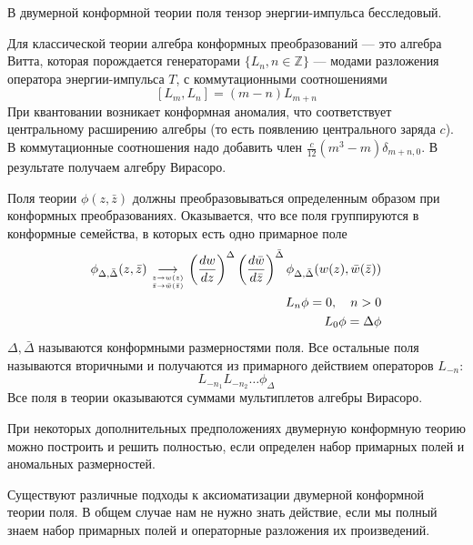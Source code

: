 \documentclass[a4paper,12pt]{article}
\theoremstyle{definition} \newtheorem{Def}{Definition}
\begin{document}
В двумерной конформной теории поля тензор энергии-импульса бесследовый.

Для классической теории алгебра конформных преобразований --- это алгебра Витта, которая порождается
генераторами $\{L_n, n\in \mathbb{Z}\}$ --- модами разложения оператора энергии-импульса $T$, с
коммутационными соотношениями
\begin{equation}
  \label{eq:2}
  [L_m,L_n]=(m-n)L_{m+n}
\end{equation}
При квантовании возникает конформная аномалия, что соответствует центральному расширению алгебры (то
есть появлению центрального заряда $c$). В коммутационные соотношения надо добавить член
$\frac{c}{12}(m^3-m)\delta_{m+n,0}$. В результате получаем алгебру Вирасоро.

Поля теории $\phi(z,\bar z)$ должны преобразовываться определенным образом при конформных преобразованиях.
Оказывается, что все поля группируются в конформные семейства, в которых есть одно примарное поле
\begin{equation}
  \label{eq:3}
  \begin{split}
    \phi_{\Delta,\bar \Delta}(z,\bar z)\underset{
      \genfrac{}{}{0pt}{}{z\to w(z)}
        {\bar z \to \bar w(\bar z)}
    }
    {\longrightarrow} \left(\frac{dw}{dz}\right)^{\Delta}\left(\frac{d\bar w}{d\bar
        z}\right)^{\bar\Delta}\phi_{\Delta,\bar \Delta}(w(z),\bar w(\bar z))\\
    L_n \phi=0,\quad n>0\\
    L_0 \phi=\Delta \phi\\
  \end{split}
\end{equation}
$\Delta, \bar \Delta$ называются конформными размерностями поля.
Все остальные поля называются вторичными и получаются из примарного действием операторов $L_{-n}$:
\begin{equation}
  \label{eq:67}
  L_{-n_1}L_{-n_2}\dots \phi_{\Delta}
\end{equation}
Все поля в теории оказываются суммами мультиплетов алгебры Вирасоро.

При некоторых дополнительных предположениях двумерную конформную теорию можно построить и решить
полностью, если определен набор примарных полей и аномальных размерностей. 

Существуют различные подходы к аксиоматизации двумерной конформной теории поля. В общем случае нам
не нужно знать действие, если мы полный знаем набор примарных полей и операторные разложения их
произведений. 
\end{document}
